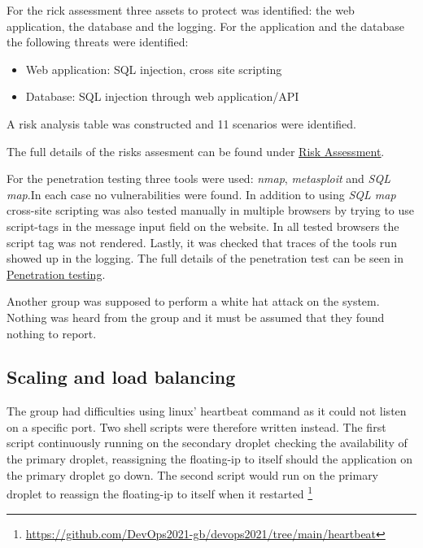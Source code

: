 For the rick assessment three assets to protect was identified: the web application, the database and the logging. For the application and the database the following threats were identified:

\begin{itemize}
    \item Web application: SQL injection, cross site scripting
    \item Database: SQL injection through web application/API
\end{itemize}

A risk analysis table was constructed and 11 scenarios were identified. 

The full details of the risks assesment can be found under \underline{\href{https://github.com/DevOps2021-gb/devops2021/wiki/Risk-assesment}{Risk Assessment}}.

For the penetration testing three tools were used: \textit{nmap}, \textit{metasploit} and \textit{SQL map}.In each case no vulnerabilities were found. In addition to using \textit{SQL map} cross-site scripting was also tested manually in multiple browsers by trying to use script-tags in the message input field on the website. In all tested browsers the script tag was not rendered. Lastly, it was checked that traces of the tools run showed up in the logging. The full details of the penetration test can be seen in \underline{\href{https://github.com/DevOps2021-gb/devops2021/wiki/Penetration-testing}{Penetration testing}}. 

Another group was supposed to perform a white hat attack on the system. Nothing was heard from the group and it must be assumed that they found nothing to report.

\subsection{Scaling and load balancing}\label{subsection:scaling} %
The group had difficulties using linux' heartbeat command as it could not listen on a specific port. Two shell scripts were therefore written instead. The first script continuously running on the secondary droplet checking the availability of the primary droplet, reassigning the floating-ip to itself should the application on the primary droplet go down. The second script would run on the primary droplet to reassign the floating-ip to itself when it restarted \footnote{\url{https://github.com/DevOps2021-gb/devops2021/tree/main/heartbeat}}